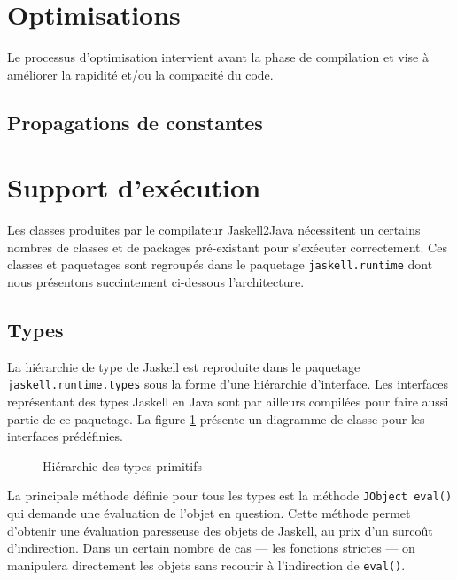 \section{Optimisations}

Le processus d'optimisation intervient avant la phase de compilation
et vise \`a am\'eliorer la rapidit\'e et/ou la compacit\'e du code. 

\subsection{Propagations de constantes}

\section{Support d'ex\'ecution}

Les classes produites par le compilateur \textsf{Jaskell2Java}
n\'ecessitent un certains nombres de classes et de packages pr\'e-existant
pour s'ex\'ecuter correctement. Ces classes et paquetages sont regroup\'es
dans le paquetage \texttt{jaskell.runtime} dont nous pr\'esentons
succintement ci-dessous l'architecture. 

\subsection{Types}

La hi\'erarchie de type de Jaskell est reproduite dans le paquetage
\texttt{jaskell.runtime.types} sous la forme d'une hi\'erarchie
d'interface. Les interfaces repr\'esentant des types Jaskell en Java
sont par ailleurs compil\'ees pour faire aussi partie de ce paquetage. 
La figure \ref{fig:hier-types} pr\'esente un diagramme de classe pour
les interfaces pr\'ed\'efinies. 

\begin{figure}
\caption{Hi\'erarchie des types primitifs}
\label{fig:hier-types}
\begin{center}
\end{center}
\end{figure}

La principale m\'ethode d\'efinie pour tous les types est la m\'ethode
\texttt{JObject eval()} qui demande une \'evaluation de l'objet en
question. Cette m\'ethode  permet d'obtenir une \'evaluation paresseuse
des objets de Jaskell, au prix d'un surco\^ut d'indirection. Dans un
certain nombre de cas --- les fonctions strictes --- on manipulera
directement les objets sans recourir \`a l'indirection de
\texttt{eval()}. 

